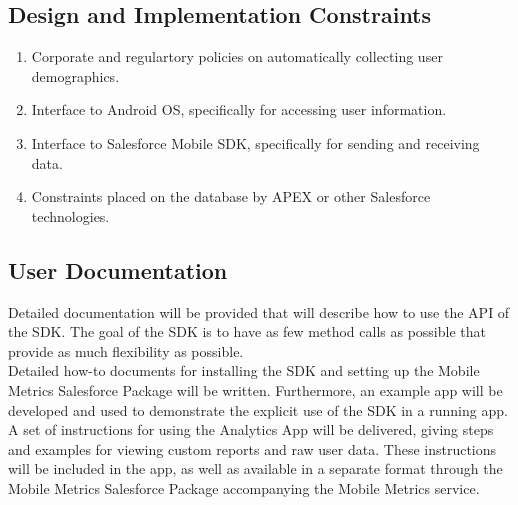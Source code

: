 \documentclass[12pt,oneside,letterpaper]{article}
\begin{document}
\subsection{Design and Implementation Constraints}
\begin{enumerate}
\item Corporate and regulartory policies on automatically collecting user demographics.
\item Interface to Android OS, specifically for accessing user information.
\item Interface to Salesforce Mobile SDK, specifically for sending and receiving data.
\item Constraints placed on the database by APEX or other Salesforce technologies.
\end{enumerate}
\subsection{User Documentation}
Detailed documentation will be provided that will describe how to use the API of the SDK. The goal of the SDK is to have as few method calls as possible that provide as much flexibility as possible.\\
Detailed how-to documents for installing the SDK and setting up the Mobile Metrics Salesforce Package will be written. Furthermore, an example app will be developed and used to demonstrate the explicit use of the SDK in a running app.\\
A set of instructions for using the Analytics App will be delivered, giving steps and examples for viewing custom reports and raw user data. These instructions will be included in the app, as well as available in a separate format through the Mobile Metrics Salesforce Package accompanying the Mobile Metrics service.
\end{document}
